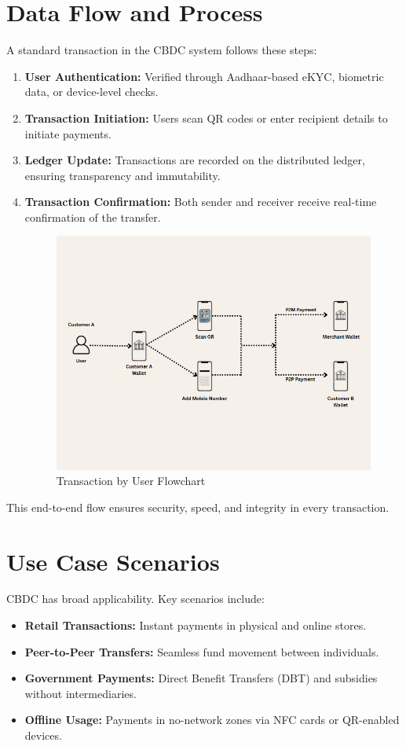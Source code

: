 \section{Data Flow and Process}
A standard transaction in the CBDC system follows these steps:
\begin{enumerate}
    \item \textbf{User Authentication:} Verified through Aadhaar-based eKYC, biometric data, or device-level checks.
    \item \textbf{Transaction Initiation:} Users scan QR codes or enter recipient details to initiate payments.
    \item \textbf{Ledger Update:} Transactions are recorded on the distributed ledger, ensuring transparency and immutability.
    \item \textbf{Transaction Confirmation:} Both sender and receiver receive real-time confirmation of the transfer.
\begin{figure}
    \centering
    \includegraphics[width=0.9\linewidth]{chp5img1.png}
    \caption{Transaction by User Flowchart}
    \label{fig:enter-label}
\end{figure}
\end{enumerate}
This end-to-end flow ensures security, speed, and integrity in every transaction.

\section{Use Case Scenarios}
CBDC has broad applicability. Key scenarios include:
\begin{itemize}
    \item \textbf{Retail Transactions:} Instant payments in physical and online stores.
    \item \textbf{Peer-to-Peer Transfers:} Seamless fund movement between individuals.
    \item \textbf{Government Payments:} Direct Benefit Transfers (DBT) and subsidies without intermediaries.
    \item \textbf{Offline Usage:} Payments in no-network zones via NFC cards or QR-enabled devices.
\end{itemize}

